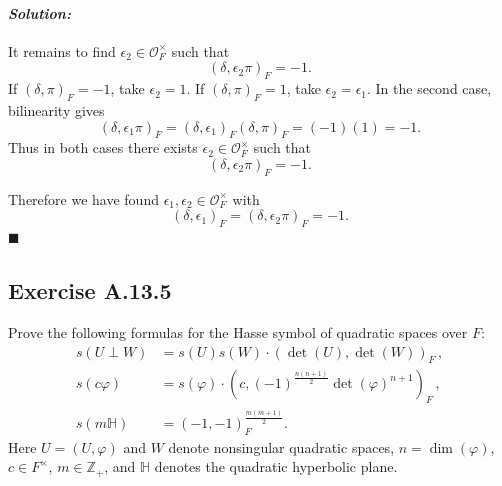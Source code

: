 \documentclass[12pt, a4paper]{article}
\newenvironment{solution}
  {\paragraph{\textit{Solution:}}\par\medskip}
  {\hfill$\blacksquare$\vspace{0.1cm}}
\begin{document}
\begin{solution}
It remains to find \(\epsilon_2\in\mathcal O_F^\times\) such that
\[
(\delta,\epsilon_2\pi)_F=-1.
\]
If \((\delta,\pi)_F=-1\), take \(\epsilon_2=1\). If
\((\delta,\pi)_F=1\), take \(\epsilon_2=\epsilon_1\). In the second case,
bilinearity gives
\[
(\delta,\epsilon_1\pi)_F
=
(\delta,\epsilon_1)_F(\delta,\pi)_F
=
(-1)(1)
=
-1.
\]
Thus in both cases there exists
\(\epsilon_2\in\mathcal O_F^\times\) such that
\[
(\delta,\epsilon_2\pi)_F=-1.
\]

Therefore we have found \(\epsilon_1,\epsilon_2\in\mathcal O_F^\times\) with
\[
(\delta,\epsilon_1)_F=(\delta,\epsilon_2\pi)_F=-1.
\]
\end{solution}


\subsection*{Exercise A.13.5}
Prove the following formulas for the Hasse symbol of quadratic spaces over $F$:
\begin{align*}
    s(U \perp W) &= s(U)s(W) \cdot (\det(U), \det(W))_F \,, \\
    s(c\varphi) &= s(\varphi) \cdot \left( c, (-1)^{\frac{n(n+1)}{2}} \det(\varphi)^{n+1} \right)_F \,, \\
    s(m\mathbb{H}) &= \left( -1, -1 \right)_F^{\frac{m(m+1)}{2}} .
\end{align*}
Here $U = (U, \varphi)$ and $W$ denote nonsingular quadratic spaces, $n = \dim(\varphi)$, $c \in F^\times$, $m \in \mathbb{Z}_+$, and $\mathbb{H}$ denotes the quadratic hyperbolic plane.
\end{document}
